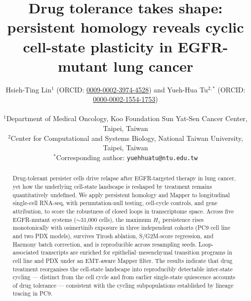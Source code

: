 \documentclass[Numbered, sn-mathphys-num]{sn-jnl}
\title{Drug tolerance takes shape: persistent homology reveals cyclic
       cell-state plasticity in EGFR-mutant lung cancer}
\author{Hsieh-Ting Lin$^{1}$ (ORCID: \href{https://orcid.org/0009-0002-3974-4528}{0009-0002-3974-4528}) and Yueh-Hua Tu$^{2,\ast}$ (ORCID: \href{https://orcid.org/0000-0002-1554-1753}{0000-0002-1554-1753})\\
  \\
  \small $^{1}$Department of Medical Oncology, Koo Foundation Sun Yat-Sen Cancer Center, Taipei, Taiwan\\
  \small $^{2}$Center for Computational and Systems Biology, National Taiwan University, Taipei, Taiwan\\
  \small $^{\ast}$Corresponding author: \texttt{yuehhuatu@ntu.edu.tw}}
\begin{document}
\maketitle

\begin{abstract}
  Drug-tolerant persister cells drive relapse after EGFR-targeted
  therapy in lung cancer, yet how the underlying cell-state landscape
  is reshaped by treatment remains quantitatively undefined. We apply
  persistent homology and Mapper to longitudinal single-cell RNA-seq,
  with permutation-null testing, cell-cycle controls, and gene
  attribution, to score the robustness of closed loops in transcriptome
  space. Across five EGFR-mutant systems ($\sim$31{,}000 cells), the
  maximum $H_1$ persistence rises monotonically with osimertinib
  exposure in three independent cohorts (PC9 cell line and two PDX
  models), survives Tirosh ablation, S/G2M-score regression, and
  Harmony batch correction, and is reproducible across resampling
  seeds. Loop-associated transcripts are enriched for
  epithelial--mesenchymal transition programs in cell line and PDX
  under an EMT-aware Mapper filter. The results indicate that drug
  treatment reorganises the cell-state landscape into reproducibly
  detectable inter-state cycling --- distinct from the cell cycle and
  from earlier single-state quiescence accounts of drug tolerance ---
  consistent with the cycling subpopulations established by lineage
  tracing in PC9.
\end{abstract}

\end{document}
